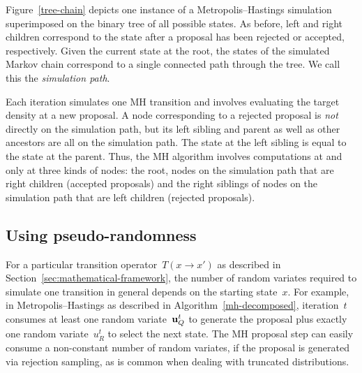 \documentclass[angelino.tex]{subfiles}
\begin{document}
Figure~\ref{tree-chain} depicts one instance of a Metropolis--Hastings
simulation superimposed on the binary tree of all possible states.
As before, left and right children correspond to the state
after a proposal has been rejected or accepted, respectively.
Given the current state at the root, the states of the simulated Markov chain
correspond to a single connected path through the tree.
We call this the \emph{simulation path}.

Each iteration simulates one MH transition and involves evaluating the target
density at a new proposal.
A node corresponding to a rejected proposal is \emph{not} directly on the
simulation path, but its left sibling and parent as well as other ancestors are
all on the simulation path.
The state at the left sibling is equal to the state at the parent.
Thus, the MH algorithm involves computations at and only at three kinds of
nodes: the root, nodes on the simulation path that are right children 
(accepted proposals) and the right siblings of nodes on the simulation path that
are left children (rejected proposals).

\subsection{Using pseudo-randomness}
\label{sec:using-randomness}


For a particular transition operator~$T(x \rightarrow x')$ as described in 
Section~\ref{sec:mathematical-framework}, the number of random variates required
to simulate one transition in general depends on the starting state~$x$.
%
For example, in Metropolis--Hastings as described in
Algorithm~\ref{mh-decomposed}, iteration~$t$ consumes
at least one random variate~$\mathbf{u}_Q^t$ to generate the proposal
plus exactly one random variate~$u_R^t$ to select the next state. 
%
The MH proposal step can easily consume a non-constant number of random
variates, \eg if the proposal is generated via rejection sampling,
as is common when dealing with truncated distributions.
\end{document}
